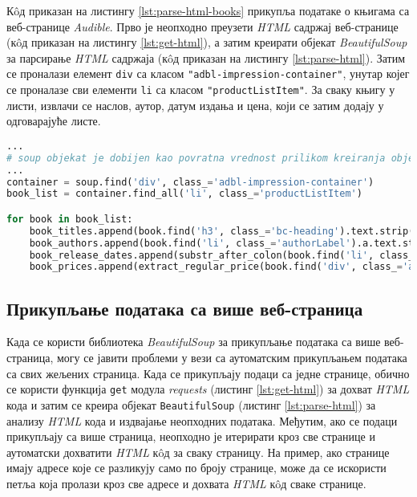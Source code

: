 \documentclass[12pt,oneside]{memoir}
\begin{document}
Кôд приказан на листингу \ref{lst:parse-html-books} прикупља податаке о књигама са веб-странице \textit{Audible}. Прво је неопходно преузети \textit{HTML} садржај веб-странице (кôд приказан на листингу \ref{lst:get-html}), а затим креирати објекат \textit{BeautifulSoup} за парсирање  \textit{HTML} садржаја (кôд приказан на листингу \ref{lst:parse-html}). Затим се проналази елемент \texttt{div} са класом \texttt{"adbl-impression-container"}, унутар којег се проналазе сви елементи \texttt{li} са класом \texttt{"productListItem"}. За сваку књигу у листи, извлачи се наслов, аутор, датум издања и цена, који се затим додају у одговарајуће листе.

\begin{lstlisting}[language=Python, caption={
Издвајање наслова, аутора, датума издања и цене књиге из \textit{HTML} кода веб-странице}, label={lst:parse-html-books}]
...
# soup objekat je dobijen kao povratna vrednost prilikom kreiranja objekta tipa BeautifulSoup
...
container = soup.find('div', class_='adbl-impression-container')
book_list = container.find_all('li', class_='productListItem')

for book in book_list:
    book_titles.append(book.find('h3', class_='bc-heading').text.strip())
    book_authors.append(book.find('li', class_='authorLabel').a.text.strip())
    book_release_dates.append(substr_after_colon(book.find('li', class_='releaseDateLabel').text.strip()))
    book_prices.append(extract_regular_price(book.find('div', class_='adblBuyBoxPrice').text.strip()))
\end{lstlisting}

\subsection{Прикупљање података са више веб-страница} 
Када се користи библиотека \textit{BeautifulSoup} за прикупљање података са више веб-страница, могу се јавити проблеми у вези са аутоматским прикупљањем података са свих жељених страница. Када се прикупљају подаци са једне странице, обично се користи функција \texttt{get} модула \textit{requests} (листинг \ref{lst:get-html}) за дохват \textit{HTML} кода и затим се креира објекат \texttt{BeautifulSoup} (листинг \ref{lst:parse-html}) за анализу \textit{HTML} кода и издвајање неопходних података. Међутим, ако се подаци прикупљају са више страница, неопходно је итерирати кроз све странице и аутоматски дохватити \textit{HTML} кôд за сваку страницу. На пример, ако странице имају адресе које се разликују само по броју странице, може да се искористи петља која пролази кроз све адресе и дохвата \textit{HTML} кôд сваке странице.
\end{document}
